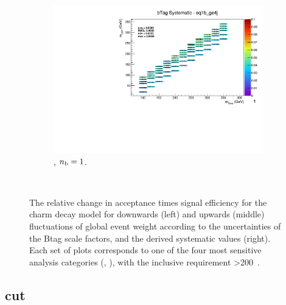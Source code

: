 \begin{figure}[ht!]
\begin{subfigure}[b]{0.32\textwidth}
    \includegraphics[width=\textwidth, page=1]{Figs/sms/t2cc/v37_3/systs/T2cc_bTag_eq1b_ge4j.pdf}
    \caption{\njhigh, $n_{\text{b}} = 1$.}
  \end{subfigure}\\
  \caption{The relative change in acceptance times signal efficiency for the
  charm decay model for downwards (left) and upwards (middle) fluctuations
  of global event weight according to the uncertainties of the Btag scale 
  factors,
  and the derived systematic values (right). Each set of plots corresponds
  to one of the four most sensitive analysis categories (\nb, \nj), with the
  inclusive requirement \HT>200~\gev.}
  \label{fig:sms-btag-t2cc}
\end{figure}


\newpage
\subsection*{\mhtmet cut}
\label{sec:t2cc_mhtmet_plots}

